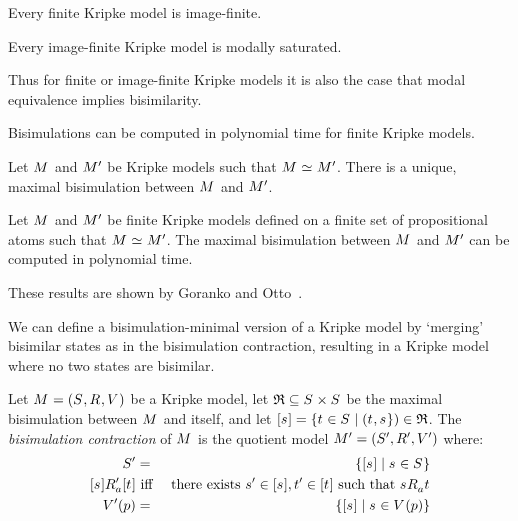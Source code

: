 \begin{proposition}
Every finite Kripke model is image-finite.
\end{proposition}

\begin{proposition}
Every image-finite Kripke model is modally saturated.
\end{proposition}

Thus for finite or image-finite Kripke models it is also the case that modal equivalence implies bisimilarity.

Bisimulations can be computed in polynomial time for finite Kripke models.

\begin{proposition}
Let $\kModel$ and ${M^{\prime}_{}}$ be Kripke models such that $\kModel \bisimilar \kModelP$.
There is a unique, maximal bisimulation between $\kModel$ and ${M^{\prime}_{}}$.
\end{proposition}

\begin{proposition}
Let $\kModel$ and ${M^{\prime}_{}}$ be finite Kripke models defined on a finite set of propositional atoms such that $\kModel \bisimilar \kModelP$.
The maximal bisimulation between $\kModel$ and ${M^{\prime}_{}}$ can be computed in polynomial time.
\end{proposition}

These results are shown by Goranko and Otto~\cite[pp. 273-274]{goranko:2006}.

We can define a bisimulation-minimal version of a Kripke model by `merging' bisimilar states as in the bisimulation contraction, resulting in a Kripke model where no two states are bisimilar.

\begin{definition}
Let $\kModelAndTuple$ be a Kripke model,
let $\bisimulation \subseteq \kStates \times \kStates$ be the maximal bisimulation between $\kModel$ and itself,
and let ${[\kStateS]} = \{\kStateT \in \kStates \mid (\kStateT, \kStateS\}) \in \bisimulation$.
The {\em bisimulation contraction} of $\kModel$ is the quotient model $\kModelAndTupleP$ where:
\begin{eqnarray*}
    \kStatesP &=& \{{[\kStateS]} \mid \kStateS \in \kStates\}\\
    {[\kStateS]} \kAccessibilityPA {[\kStateT]} &\text{ iff }& \text{there exists } \kStateSP \in {[\kStateS]}, \kStateTP \in {[\kStateT]} \text{ such that } \kStateS \kAccessibilityA \kStateT\\
    \kValuationP(\atomP) &=& \{{[\kStateS]} \mid \kStateS \in \kValuation(\atomP)\}
\end{eqnarray*}
\end{definition}

